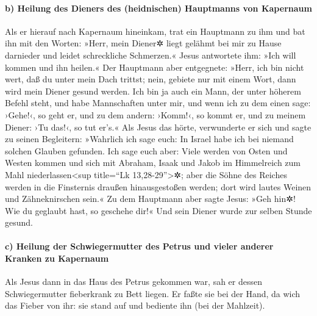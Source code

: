 \hypertarget{b-heilung-des-dieners-des-heidnischen-hauptmanns-von-kapernaum}{%
\paragraph{b) Heilung des Dieners des (heidnischen) Hauptmanns von
Kapernaum}\label{b-heilung-des-dieners-des-heidnischen-hauptmanns-von-kapernaum}}

 Als er hierauf nach Kapernaum hineinkam, trat ein
Hauptmann zu ihm und bat ihn  mit den Worten: »Herr, mein
Diener✲ liegt gelähmt bei mir zu Hause darnieder und leidet schreckliche
Schmerzen.«  Jesus antwortete ihm: »Ich will kommen und
ihn heilen.«  Der Hauptmann aber entgegnete: »Herr, ich
bin nicht wert, daß du unter mein Dach trittst; nein, gebiete nur mit
einem Wort, dann wird mein Diener gesund werden.  Ich bin
ja auch ein Mann, der unter höherem Befehl steht, und habe Mannschaften
unter mir, und wenn ich zu dem einen sage: ›Gehe!‹, so geht er, und zu
dem andern: ›Komm!‹, so kommt er, und zu meinem Diener: ›Tu das!‹, so
tut er's.«  Als Jesus das hörte, verwunderte er sich und
sagte zu seinen Begleitern: »Wahrlich ich sage euch: In Israel habe ich
bei niemand solchen Glauben gefunden.  Ich sage euch
aber: Viele werden von Osten und Westen kommen und sich mit Abraham,
Isaak und Jakob im Himmelreich zum Mahl niederlassen\textless sup
title=``Lk 13,28-29''\textgreater✲;  aber die Söhne des
Reiches werden in die Finsternis draußen hinausgestoßen werden; dort
wird lautes Weinen und Zähneknirschen sein.«  Zu dem
Hauptmann aber sagte Jesus: »Geh hin✲! Wie du geglaubt hast, so geschehe
dir!« Und sein Diener wurde zur selben Stunde gesund.

\hypertarget{c-heilung-der-schwiegermutter-des-petrus-und-vieler-anderer-kranken-zu-kapernaum}{%
\paragraph{c) Heilung der Schwiegermutter des Petrus und vieler anderer
Kranken zu
Kapernaum}\label{c-heilung-der-schwiegermutter-des-petrus-und-vieler-anderer-kranken-zu-kapernaum}}

 Als Jesus dann in das Haus des Petrus gekommen war, sah
er dessen Schwiegermutter fieberkrank zu Bett liegen.  Er
faßte sie bei der Hand, da wich das Fieber von ihr: sie stand auf und
bediente ihn (bei der Mahlzeit).

